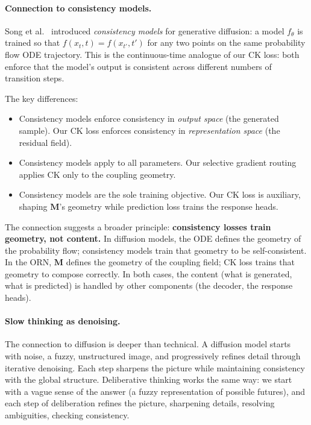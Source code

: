 \documentclass[11pt, a4paper]{article}
\newcommand{\M}{\mathbf{M}}
\theoremstyle{plain}
\theoremstyle{remark}
\begin{document}
\paragraph{Connection to consistency models.}
Song et al.~\cite{song2023consistency} introduced \emph{consistency models} for generative diffusion: a model $f_\theta$ is trained so that $f(x_t, t) = f(x_{t'}, t')$ for any two points on the same probability flow ODE trajectory.
This is the continuous-time analogue of our CK loss: both enforce that the model's output is consistent across different numbers of transition steps.

The key differences:
\begin{itemize}[nosep]
    \item Consistency models enforce consistency in \emph{output space} (the generated sample). Our CK loss enforces consistency in \emph{representation space} (the residual field).
    \item Consistency models apply to all parameters. Our selective gradient routing applies CK only to the coupling geometry.
    \item Consistency models are the sole training objective. Our CK loss is auxiliary, shaping $\M$'s geometry while prediction loss trains the response heads.
\end{itemize}

The connection suggests a broader principle: \textbf{consistency losses train geometry, not content.}
In diffusion models, the ODE defines the geometry of the probability flow; consistency models train that geometry to be self-consistent.
In the ORN, $\M$ defines the geometry of the coupling field; CK loss trains that geometry to compose correctly.
In both cases, the content (what is generated, what is predicted) is handled by other components (the decoder, the response heads).

\paragraph{Slow thinking as denoising.}
The connection to diffusion is deeper than technical.
A diffusion model starts with noise, a fuzzy, unstructured image, and progressively refines detail through iterative denoising.
Each step sharpens the picture while maintaining consistency with the global structure.
Deliberative thinking works the same way: we start with a vague sense of the answer (a fuzzy representation of possible futures), and each step of deliberation refines the picture, sharpening details, resolving ambiguities, checking consistency.
\end{document}
